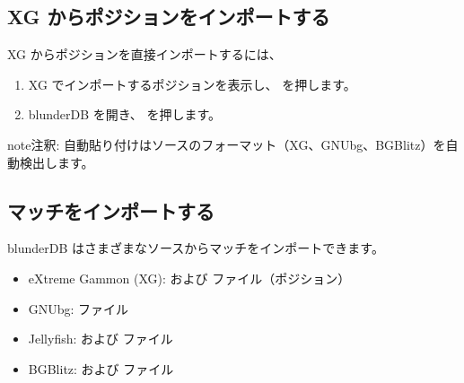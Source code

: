 \documentclass[letterpaper,10pt,dvipdfmx]{sphinxmanual}
\begin{document}
\subsection{XG からポジションをインポートする}
\label{\detokenize{guide_utilisateur:import-une-position-depuis-xg}}
\sphinxAtStartPar
XG からポジションを直接インポートするには、
\begin{enumerate}
%
\item {} 
\sphinxAtStartPar
XG でインポートするポジションを表示し、 を押します。

\item {} 
\sphinxAtStartPar
blunderDB を開き、 を押します。

\end{enumerate}

\begin{sphinxadmonition}{note}{注釈:}
\sphinxAtStartPar
自動貼り付けはソースのフォーマット（XG、GNUbg、BGBlitz）を自動検出します。
\end{sphinxadmonition}


\subsection{マッチをインポートする}
\label{\detokenize{guide_utilisateur:importer-un-match}}
\sphinxAtStartPar
blunderDB はさまざまなソースからマッチをインポートできます。

\sphinxAtStartPar
{}
\begin{itemize}
\item {} 
\sphinxAtStartPar
eXtreme Gammon (XG):  および  ファイル（ポジション）

\item {} 
\sphinxAtStartPar
GNUbg:  ファイル

\item {} 
\sphinxAtStartPar
Jellyfish:  および  ファイル

\item {} 
\sphinxAtStartPar
BGBlitz:  および  ファイル

\end{itemize}
\end{document}
